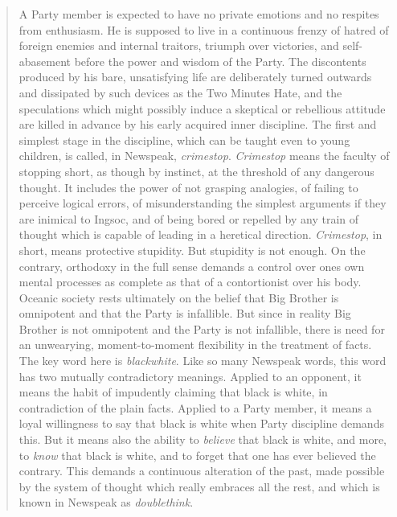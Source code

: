 \begin{quotation}
A Party member is expected to have no private emotions and no respites
from enthusiasm. He is supposed to live in a continuous frenzy of hatred
of foreign enemies and internal traitors, triumph over victories, and
self-abasement before the power and wisdom of the Party. The discontents
produced by his bare, unsatisfying life are deliberately turned outwards
and dissipated by such devices as the Two Minutes Hate, and the
speculations which might possibly induce a skeptical or rebellious
attitude are killed in advance by his early acquired inner discipline.
The first and simplest stage in the discipline, which can be taught even
to young children, is called, in Newspeak, \emph{crimestop}.
\emph{Crimestop} means the faculty of stopping short, as though by
instinct, at the threshold of any dangerous thought. It includes the
power of not grasping analogies, of failing to perceive logical errors,
of misunderstanding the simplest arguments if they are inimical to
Ingsoc, and of being bored or repelled by any train of thought which is
capable of leading in a heretical direction. \emph{Crimestop}, in short,
means protective stupidity. But stupidity is not enough. On the
contrary, orthodoxy in the full sense demands a control over
one\textquotesingle s own mental processes as complete as that of a
contortionist over his body. Oceanic society rests ultimately on the
belief that Big Brother is omnipotent and that the Party is infallible.
But since in reality Big Brother is not omnipotent and the Party is not
infallible, there is need for an unwearying, moment-to-moment
flexibility in the treatment of facts. The key word here is
\emph{blackwhite}. Like so many Newspeak words, this word has two
mutually contradictory meanings. Applied to an opponent, it means the
habit of impudently claiming that black is white, in contradiction of
the plain facts. Applied to a Party member, it means a loyal willingness
to say that black is white when Party discipline demands this. But it
means also the ability to \emph{believe} that black is white, and more,
to \emph{know} that black is white, and to forget that one has ever
believed the contrary. This demands a continuous alteration of the past,
made possible by the system of thought which really embraces all the
rest, and which is known in Newspeak as \emph{doublethink}.


\end{quotation}
